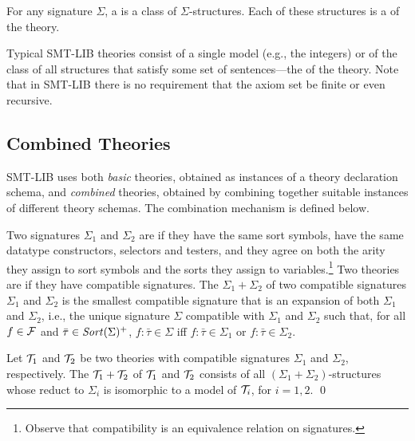 \begin{definition}[Theory]
For any signature $\Sigma$,
a  is a class of $\Sigma$-structures.
Each of these structures is a  of the theory.
\end{definition}

Typical SMT-LIB theories consist of a single model 
(e.g., the integers)
or 
of the class of all structures that satisfy some set of sentences---the
 of the theory.
Note that in SMT-LIB there is no requirement that the axiom set be
finite or even recursive.


\subsection{Combined Theories} \label{sec:comb-theories}

SMT-LIB uses both \emph{basic} theories, 
obtained as instances of a theory declaration schema,
and \emph{combined} theories, obtained by combining together
suitable instances of different theory sche\-mas.
The combination mechanism is defined below.

Two signatures $\Sigma_1$ and $\Sigma_2$ are  
if they have the same sort symbols, 
have the same datatype constructors, selectors and testers, and they agree 
on both the arity they assign to sort symbols and 
the sorts they assign to variables.\footnote{%
Observe that compatibility is an equivalence relation on signatures.
}
Two theories are  if they have compatible signatures.
The  $\Sigma_1 + \Sigma_2$
of two compatible signatures $\Sigma_1$ and $\Sigma_2$
is the smallest compatible signature
that is an expansion of both $\Sigma_1$ and $\Sigma_2$,
i.e., the unique signature $\Sigma$ compatible 
with $\Sigma_1$ and $\Sigma_2$ such that,
for all $f \in \mathcal{F}$ and $\bar{\tau} \in \mathit{Sort}(\Sigma)^+$,
$f{:}\bar{\tau} \in \Sigma$ iff 
$f{:}\bar{\tau} \in \Sigma_1$ or
$f{:}\bar{\tau} \in \Sigma_2$.

\begin{definition}
\label{def:theorycomb}
Let $\mathcal{T}_1$ and $\mathcal{T}_2$ be two theories 
with compatible signatures $\Sigma_1$ and $\Sigma_2$, respectively. 
The  $\mathcal{T}_1 + \mathcal{T}_2$ of $\mathcal{T}_1$ and $\mathcal{T}_2$
consists of all $(\Sigma_1+\Sigma_2)$-structures
whose reduct to $\Sigma_i$ is isomorphic to a model of $\mathcal{T}_i$,
for $i=1,2$.
\qed
\end{definition}

